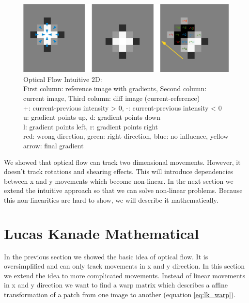 \documentclass[11pt,a4paper,titlepage,oneside]{report}
\begin{document}
\begin{figure}[H]
  \includegraphics[width=1.0\textwidth]{img/optical_flow_2d.png}
  \caption{Optical Flow Intuitive 2D:\\
		First column: reference image with gradients, Second column: current image, Third column: diff image (current-reference)\\
		+: current-previous intensity > 0, -: current-previous intensity < 0\\
		u: gradient points up, d: gradient points down\\
		l: gradient points left, r: gradient points right\\
		red: wrong direction, green: right direction, blue: no influence, yellow arrow: final gradient}\label{fig:optical_flow_2d}
\end{figure}

We showed that optical flow can track two dimensional movements. However, it doesn't track rotations and shearing effects. This will introduce dependencies between x and y movements which become non-linear. In the next section we extend the intuitive approach so that we can solve non-linear problems. Because this non-linearities are hard to show, we will describe it mathematically.

\section{Lucas Kanade Mathematical}

In the previous section we showed the basic idea of optical flow. It is oversimplified and can only track movements in x and y direction. In this section we extend the idea to more complicated movements. Instead of linear movements in x and y direction we want to find a warp matrix which describes a affine transformation of a patch from one image to another (equation \ref{eq:lk_warp}).
\end{document}
